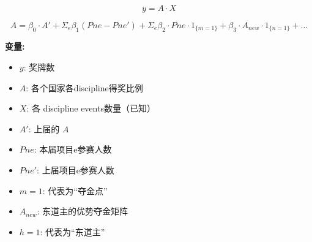 \documentclass{article}
\begin{document}
\begin{equation}
y = A \cdot X
\end{equation}

\begin{equation}
A = \beta_0 \cdot A' + \Sigma_e \beta_1 (Pne - Pne') + \Sigma_e \beta_2 \cdot Pne \cdot 1_{\{m=1\}} + \beta_3 \cdot A_{new} \cdot 1_{\{n=1\}} + \dots
\end{equation}

\textbf{变量:}
\begin{itemize}
    \item $y$: 奖牌数
    \item $A$: 各个国家各discipline得奖比例
    \item $X$: 各 discipline events数量（已知）
    \item $A'$: 上届的 $A$
    \item $Pne$: 本届项目e参赛人数
    \item $Pne'$: 上届项目e参赛人数
    \item $m=1$: 代表为“夺金点”
    \item $A_{new}$: 东道主的优势夺金矩阵
    \item $h=1$: 代表为“东道主”
\end{itemize}
\end{document}
